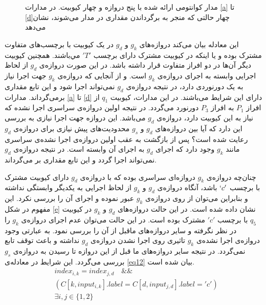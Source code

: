 \begin{itemize}
\begin{figure}
{
}
\caption{مدار کوانتومی ارائه شده با پنج دروازه و چهار کیوبیت. در مدارات \ref{a} تا \ref{d}چهار حالتی که منجر به برگرداندن مقداری  در مدار می‌شوند، نشان می‌دهد}
\end{figure} 

این معادله بیان می‌کند دروازه‌های $g_{k}$ و $g_{d}$ در یک کیوبیت با برچسب‌های متفاوت مشترک بوده و یا اینکه در کیوبیت مشترک دارای برچسب $'T'$ مي‌باشند. همچنین کیوبیت دیگر آن‌ها در دو افراز متفاوت قرار داشته باشد. در این صورت دروازه‌ی $g_{d}$ از لحاظ اجرایی وابسته به اجرای دروازه‌ی $g_{k}$ است. و از آنجایی که دروازه‌ی $g_{k}$ جهت اجرا نیاز به یک دورنوردی دارد، در نتیجه دروازه‌‌ی $g_{d}$ نمی‌تواند اجرا شود و این تابع مقداری  برمی‌گرداند. مدارات \ref{a} تا \ref{d} دارای این شرایط می‌باشند. در این مدارات، کیوبیت $q_{1}$ از افراز $P_{1}$ به افراز $P_{3}$ دورنورد می‌گردد. در نتیجه اولین دروازه‌ی سراسری اجرا نشده که نیاز به این کیوبیت دارد، دروازه‌ی $g_{d}$ می‌باشد. این دروازه جهت اجرا نیازی به بررسی این دارد که آیا بین دروازه‌های $g_{d}$ و $g_{s}$ محدودیت‌های پیش نیازی برای دروازه‌ی $g_{d}$ رعایت شده است؟ پس از بازگشت به عقب اولین دروازه‌ی اجرا نشده‌ی سراسری مانند $g_{k}$ وجود دارد که اجرای $g_{d}$ به اجرای آن وابسته است. در نتیجه دروازه‌ی $g_{d}$ نمی‌تواند اجرا گردد و این تابع مقداری  بر می‌گرداند.

چنان‌چه دروازه‌‌ی $g_{k}$ دروازه‌‌ای سراسری بوده که با دروازه‌ی $g_{d}$ دارای کیوبیت مشترک با برچسب $`c'$ باشد، آنگاه دروازه‌ی $g_d$ و $g_k$ از لحاظ اجرایی به یکدیگر وابستگی نداشته و بنابراین می‌توان از روی دروازه‌ی $g_k$ عبور نموده و اجرای آن را بررسی نکرد. این مفهوم در شکل \ref{e} نشان داده شده است. در این حالت دروازه‌های $g_d$ و $g_k$ در کیوبیت $q_5 $ با برچسب $'c'$ مشترک بوده است. در این حالت می‌توان عدم اجرای دروازه‌ی $g_k$ را در نظر نگرفته و سایر دروازه‌های ماقبل از آن را بررسی نمود. به عبارتی وجود دروازه‌ی اجرا نشده‌ی $g_k$ تاثیری روی اجرا نشدن دروازه‌ی $g_d$ نداشته و باعث توقف تابع   نمی‌گردد. در نتیجه سایر دروازه‌های ما قبل از این دروازه تا رسیدن به دروازه‌ی $g_s$ بررسی می‌گردد. این شرایط در معادله‌ی \ref{eq12} بیان شده است.
\begin{equation}
\begin{split}
&index_{i,k}= index_{j,d}\quad \&\& \\ 
&({C[ {k,inpu{t_{i,k}}} ].label =C[{d,inpu{t_{j,d}}} ].label = 'c'} ) \\
&\exists i,j \in\{1,2\}\\
\label{eq12}
\end{split}
\end{equation}


\end{itemize}
